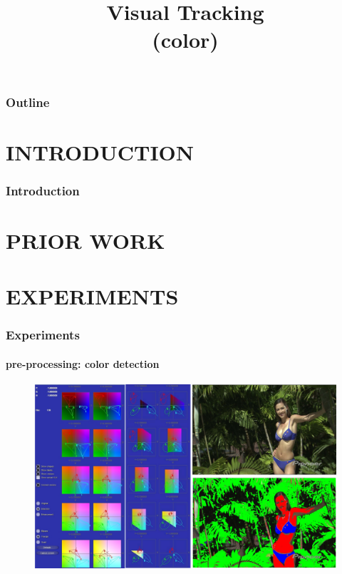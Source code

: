 
\title{Visual Tracking \\ (color)}
\begin{frame}[plain]\logoTechTower
	\titlepage
\end{frame}

\begin{frame}
\frametitle{Outline}
\logoCSIPCPL\logoTechTower
	\setcounter{tocdepth}{1}	
	\tableofcontents
\end{frame}

\section{INTRODUCTION}
\begin{frame}
\frametitle{Introduction}
\framesubtitle{}
\logoCSIPCPL\mypagenum
\end{frame}

\section{PRIOR WORK}



\section{EXPERIMENTS}
\begin{frame}
\frametitle{Experiments}
\framesubtitle{pre-processing: color detection}
\logoCSIPCPL\mypagenum
	\begin{figure}	
		\includegraphics[width=1.0\textwidth]{figs/Proposal_fig14_TRK_colorDetection.pdf}
	\end{figure}
\end{frame}


